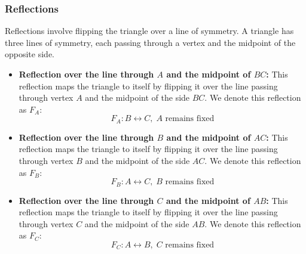 \subsubsection{Reflections}

Reflections involve flipping the triangle over a line of symmetry. A triangle has three lines of symmetry, each passing through a vertex and the midpoint of the opposite side.

\begin{itemize}
    \item \textbf{Reflection over the line through \( A \) and the midpoint of \( BC \):} This reflection maps the triangle to itself by flipping it over the line passing through vertex \( A \) and the midpoint of the side \( BC \). We denote this reflection as \( F_A \):
    \[
    F_A: B \leftrightarrow C, \; A \text{ remains fixed}
    \]
    
    \item \textbf{Reflection over the line through \( B \) and the midpoint of \( AC \):} This reflection maps the triangle to itself by flipping it over the line passing through vertex \( B \) and the midpoint of the side \( AC \). We denote this reflection as \( F_B \):
    \[
    F_B: A \leftrightarrow C, \; B \text{ remains fixed}
    \]
    
    \item \textbf{Reflection over the line through \( C \) and the midpoint of \( AB \):} This reflection maps the triangle to itself by flipping it over the line passing through vertex \( C \) and the midpoint of the side \( AB \). We denote this reflection as \( F_C \):
    \[
    F_C: A \leftrightarrow B, \; C \text{ remains fixed}
    \]
\end{itemize}

\begin{center}
\end{center}

